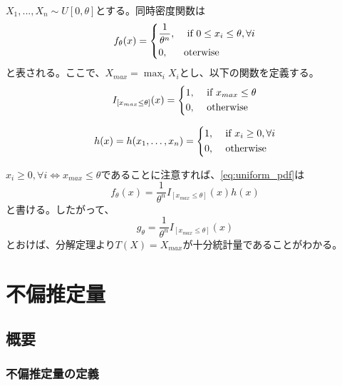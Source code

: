 \(X_1, ..., X_n \sim U[0, \theta]\)とする。同時密度関数は
\begin{equation} \label{eq:uniform_pdf}
  f_\theta (x) = 
  \begin{dcases}
    \frac{1}{\theta^{n}}, & \text{ if } 0 \leq x_i \leq \theta, \forall i \\
    0,                    & \text{oterwise}
  \end{dcases}
\end{equation}
と表される。ここで、\(X_{max} = \max_{i} X_i\)とし、以下の関数を定義する。
\begin{equation}
  I _{[x_{max} \leq \theta]}(x) =
  \begin{dcases}
    1, & \text{ if } x_{max} \leq \theta \\
    0, & \text{ otherwise}
  \end{dcases}
\end{equation}

\begin{equation}
  h(x) = h(x_1, \dots, x_n) = 
  \begin{dcases}
    1, & \text{ if } x_i \geq 0, \forall i \\
    0, & \text{ otherwise }
  \end{dcases}
\end{equation}

\(x_i \geq 0, \forall i \Leftrightarrow x_{max} \leq \theta\)であることに注意すれば、\cref{eq:uniform_pdf}は
\begin{equation}
  f_{\theta} (x) = \frac{1}{\theta^n} I _{[x_{max} \leq \theta]}(x) h(x)
\end{equation}
と書ける。したがって、
\begin{equation}
  g_{\theta} = \frac{1}{\theta^n} I _{[x_{max} \leq \theta]}(x)
\end{equation}
とおけば、分解定理より\(T(X) = X_{max}\)が十分統計量であることがわかる。


\section{不偏推定量}

\subsection{概要}

\subsubsection{不偏推定量の定義}

